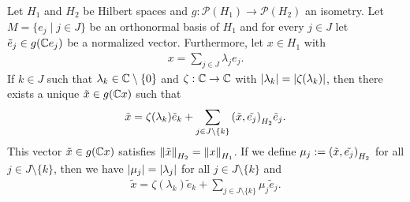 \begin{lemma} \label{lemma:aux_main}
	Let $H_1$ and $H_2$ be Hilbert spaces and $g: \mathcal{P}(H_1) \to \mathcal{P}(H_2)$ an isometry. Let $M = \{e_j \mid j \in J\}$ be an orthonormal basis of $H_1$ and for every $j \in J$ let $\tilde{e}_j \in g(\C e_j)$ be a normalized vector. Furthermore, let $x \in H_1$ with
	\begin{align*}
		x = \sum_{j \in J} \lambda_j e_j.
	\end{align*} 
	If $k \in J$ such that $\lambda_k \in \C \setminus \{0\}$ and $\zeta: \C \to \C$ with $\vbraces{\lambda_k} = \vbraces{\zeta\pbraces{\lambda_k}}$, then there exists a unique $\tilde{x} \in g(\C x)$ such that
	\begin{align*}
		\tilde{x} = \zeta(\lambda_k) \tilde{e}_k + \sum_{j \in J \setminus \{k\}} \pbraces{\tilde{x}, \tilde{e_j}}_{H_2} \tilde{e}_j.
	\end{align*}
	This vector $\tilde{x} \in g(\C x)$ satisfies $\norm[H_2]{\tilde{x}} = \norm[H_1]{x}$. If we define $\mu_j := \pbraces{\tilde{x}, \tilde{e_j}}_{H_2}$ for all $j \in J \setminus \{k\}$, then we have $\vbraces{\mu_j} = \vbraces{\lambda_j}$ for all $j \in J \setminus \{k\}$ and
	\begin{align*}
		\tilde{x} = \zeta(\lambda_k) \tilde{e}_k + \sum_{j \in J \setminus \{k\}} \mu_j \tilde{e}_j.
	\end{align*}
\end{lemma}


